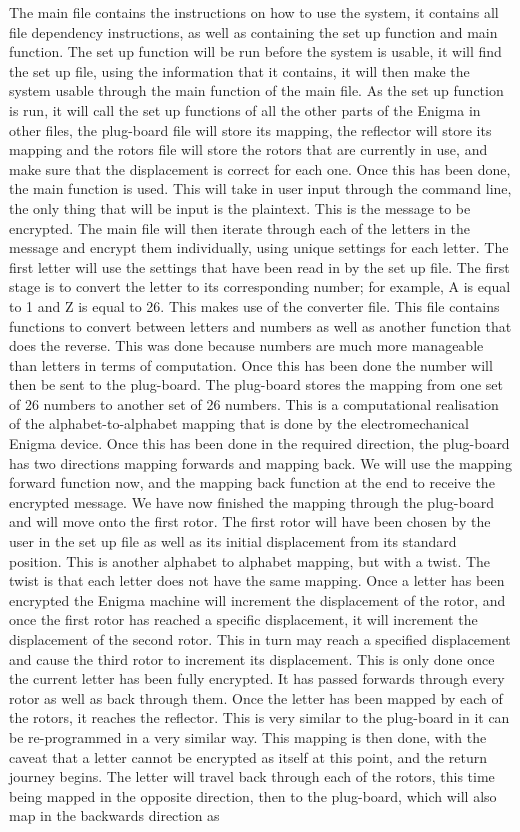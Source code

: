 \documentclass[12pt,a4paper]{article}
\begin{document}
The main file contains the instructions on how to use the system, it contains all file dependency instructions, as well as containing the set up function and main function. The set up function will be run before the system is usable, it will find the set up file, using the information that it contains, it will then make the system usable through the main function of the main file. As the set up function is run, it will call the set up functions of all the other parts of the Enigma in other files, the plug-board file will store its mapping, the reflector will store its mapping and the rotors file will store the rotors that are currently in use, and make sure that the displacement is correct for each one. Once this has been done, the main function is used. This will take in user input through the command line, the only thing that will be input is the plaintext. This is the message to be encrypted. The main file will then iterate through each of the letters in the message and encrypt them individually, using unique settings for each letter. The first letter will use the settings that have been read in by the set up file. The first stage is to convert the letter to its corresponding number; for example, A is equal to 1 and Z is equal to 26. This makes use of the converter file. This file contains functions to convert between letters and numbers as well as another function that does the reverse. This was done because numbers are much more manageable than letters in terms of computation. Once this has been done the number will then be sent to the plug-board. The plug-board stores the mapping from one set of 26 numbers to another set of 26 numbers. This is a computational realisation of the alphabet-to-alphabet mapping that is done by the electromechanical Enigma device. Once this has been done in the required direction, the plug-board has two directions mapping forwards and mapping back. We will use the mapping forward function now, and the mapping back function at the end to receive the encrypted message. We have now finished the mapping through the plug-board and will move onto the first rotor. The first rotor will have been chosen by the user in the set up file as well as its initial displacement from its standard position. This is another alphabet to alphabet mapping, but with a twist. The twist is that each letter does not have the same mapping. Once a letter has been encrypted the Enigma machine will increment the displacement of the rotor, and once the first rotor has reached a specific displacement, it will increment the displacement of the second rotor. This in turn may reach a specified displacement and cause the third rotor to increment its displacement. This is only done once the current letter has been fully encrypted. It has passed forwards through every rotor as well as back through them. Once the letter has been mapped by each of the rotors, it reaches the reflector. This is very similar to the plug-board in it can be re-programmed in a very similar way. This mapping is then done, with the caveat that a letter cannot be encrypted as itself at this point, and the return journey begins. The letter will travel back through each of the rotors, this time being mapped in the opposite direction, then to the plug-board, which will also map in the backwards direction as 
\end{document}
